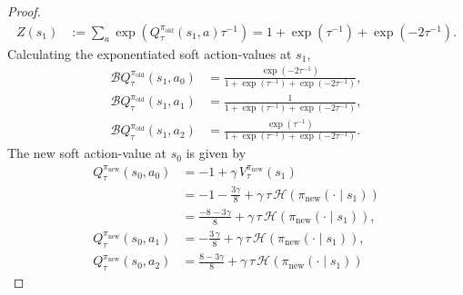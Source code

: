 \documentclass[twoside,11pt]{article}
\newcommand{\boltzmannQ}{\mathcal{B}Q}
\newcommand{\entropy}{\mathcal{H}}
\newcommand{\pinew}{{\pi_\mathrm{new}}}
\newcommand{\piold}{{\pi_\mathrm{old}}}
\begin{document}
\begin{proof}
\begin{align*}
    Z(s_1) &:= \sum_a \exp(Q_\tau^{\piold}(s_1, a) \tau^{-1}) = 1 + \exp(\tau^{-1}) + \exp(-2\tau^{-1}).
\end{align*}
Calculating the exponentiated soft action-values at $s_1$,
\begin{align*}
    \boltzmannQ_\tau^\piold(s_1, a_0) &= \frac{\exp(-2\tau^{-1})}{1 + \exp(\tau^{-1}) + \exp(-2\tau^{-1})},\\
    \boltzmannQ_\tau^\piold(s_1, a_1) &= \frac{1}{1 + \exp(\tau^{-1}) + \exp(-2\tau^{-1})},\\
    \boltzmannQ_\tau^\piold(s_1, a_2) &= \frac{\exp(\tau^{-1})}{1 + \exp(\tau^{-1}) + \exp(-2\tau^{-1})}.
\end{align*}
The new soft action-value at $s_0$ is given by
\begin{align*}
    Q_\tau^\pinew(s_0, a_0) &= -1 + \gamma \, V^\pinew_\tau(s_1) \\
        &= -1 - \frac{3\gamma}{8} + \gamma\, \tau\, \entropy(\pinew(\cdot \mid s_1)) \\
        &= \frac{-8 - 3 \gamma}{8} + \gamma\, \tau\, \entropy(\pinew(\cdot \mid s_1)),\\
    Q_\tau^\pinew(s_0, a_1) &= - \frac{3\, \gamma }{8} + \gamma\, \tau\,\entropy(\pinew(\cdot \mid s_1)) ,\\
    Q_\tau^\pinew(s_0, a_2) &= \frac{8 - 3\gamma}{8} + \gamma\, \tau\, \entropy(\pinew(\cdot \mid s_1))
\end{align*}


\end{proof}
\end{document}
